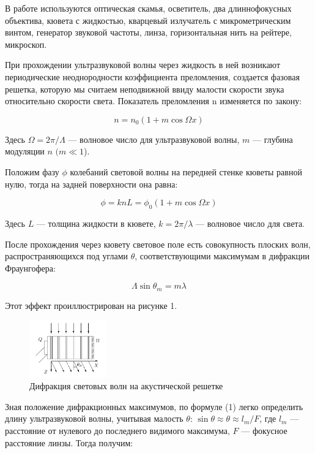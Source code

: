 \documentclass[12pt]{kiarticle} %
\begin{document}
	В работе используются оптическая скамья, осветитель, два длиннофокусных объектива, кювета с жидкостью, кварцевый излучатель с микрометрическим винтом, генератор звуковой частоты, линза, горизонтальная нить на рейтере, микроскоп. 
	
	При прохождении ультразвуковой волны через жидкость в ней возникают периодические неоднородности коэффициента преломления, создается фазовая решетка, которую мы считаем неподвижной ввиду малости скорости звука относительно скорости света. Показатель
	преломления n изменяется по закону:
	
	\begin{equation}\label{}
	n = n_0 (1 + m \cos \Omega x)
	\end{equation}
	
	Здесь $ \Omega = 2 \pi / \Lambda $ --- волновое число для ультразвуковой волны, $ m $ --- глубина модуляции $ n $ $ (m \ll 1 $).
	
	Положим фазу $ \phi $ колебаний световой волны на передней стенке кюветы равной нулю, тогда на задней поверхности она равна:
	
	\begin{equation}\label{}
	\phi  = k n L = \phi_0 (1 + m \cos \Omega x)
	\end{equation}
	
	Здесь $ L $ --- толщина жидкости в кювете, $ k = 2 \pi / \lambda $ --- волновое число для света.
	
	После прохождения через кювету световое поле есть совокупность плоских волн, распространяющихся под углами $ \theta $, соответствующими максимумам в дифракции Фраунгофера:
	
\begin{equation}\label{}	
	\Lambda \sin \theta_m = m \lambda
\end{equation}

	Этот эффект проиллюстрирован на рисунке 1.
	\begin{figure}[h!]
		\centering	
		\includegraphics[width=0.3\textwidth]{difraction.png}
		\caption{Дифракция световых волн на акустической решетке}
		\label{diff}
	\end{figure}

	Зная положение дифракционных максимумов, по формуле (1) легко определить длину ультразвуковой волны, учитывая малость $ \theta $: $ \sin \theta \approx \theta \approx l_m /F  $, где $ l_m $ --- расстояние от нулевого до последнего видимого максимума, $ F $ --- фокусное расстояние линзы. Тогда получим:
	
\end{document}
